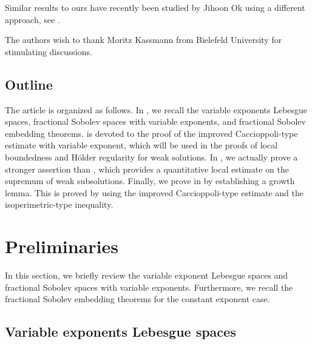 \documentclass[11pt]{amsart}
\theoremstyle{plain}
\theoremstyle{definition}
\numberwithin{equation}{section}
\begin{document}
Similar results to ours have recently been studied by Jihoon Ok using a different approach, see \cite{Ok21}.

The authors wish to thank Moritz Kassmann from Bielefeld University for stimulating discussions.

\subsection*{Outline}

The article is organized as follows. In , we recall the variable exponents Lebesgue spaces, fractional Sobolev spaces with variable exponents, and fractional Sobolev embedding theorems.  is devoted to the proof of the improved Caccioppoli-type estimate with variable exponent, which will be used in the proofs of local boundedness and H\"older regularity for weak solutions. In , we actually prove a stronger assertion  than , which provides a quantitative local estimate on the supremum of weak subsolutions. Finally, we prove  in  by establishing a growth lemma. This is proved by using the improved Caccioppoli-type estimate and the isoperimetric-type inequality.











\section{Preliminaries} \label{sec:preliminaries}

In this section, we briefly review the variable exponent Lebesgue spaces and fractional Sobolev spaces with variable exponents. Furthermore, we recall the fractional Sobolev embedding theorems for the constant exponent case.

\subsection{Variable exponents Lebesgue spaces} \label{sec:Lebesgue}
\end{document}
